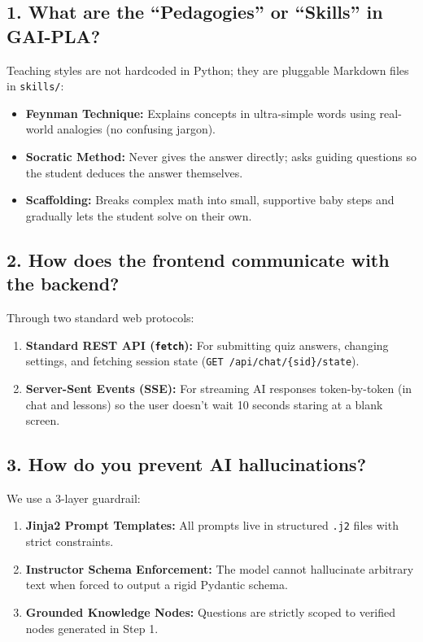 \documentclass[11pt,a4paper]{article}
\begin{document}
\subsection*{1. What are the ``Pedagogies'' or ``Skills'' in GAI-PLA?}
\begin{answerbox}
Teaching styles are not hardcoded in Python; they are pluggable Markdown files in \texttt{skills/}:
\begin{itemize}[noitemsep]
    \item \textbf{Feynman Technique:} Explains concepts in ultra-simple words using real-world analogies (no confusing jargon).
    \item \textbf{Socratic Method:} Never gives the answer directly; asks guiding questions so the student deduces the answer themselves.
    \item \textbf{Scaffolding:} Breaks complex math into small, supportive baby steps and gradually lets the student solve on their own.
\end{itemize}
\end{answerbox}

\subsection*{2. How does the frontend communicate with the backend?}
\begin{answerbox}
Through two standard web protocols:
\begin{enumerate}[noitemsep]
    \item \textbf{Standard REST API (\texttt{fetch}):} For submitting quiz answers, changing settings, and fetching session state (\texttt{GET /api/chat/\{sid\}/state}).
    \item \textbf{Server-Sent Events (SSE):} For streaming AI responses token-by-token (in chat and lessons) so the user doesn't wait 10 seconds staring at a blank screen.
\end{enumerate}
\end{answerbox}

\subsection*{3. How do you prevent AI hallucinations?}
\begin{answerbox}
We use a 3-layer guardrail:
\begin{enumerate}[noitemsep]
    \item \textbf{Jinja2 Prompt Templates:} All prompts live in structured \texttt{.j2} files with strict constraints.
    \item \textbf{Instructor Schema Enforcement:} The model cannot hallucinate arbitrary text when forced to output a rigid Pydantic schema.
    \item \textbf{Grounded Knowledge Nodes:} Questions are strictly scoped to verified nodes generated in Step 1.
\end{enumerate}
\end{answerbox}
\end{document}
